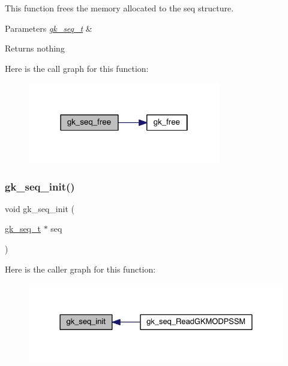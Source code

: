 This function frees the memory allocated to the seq structure. 


\begin{DoxyParams}{Parameters}
{\em \hyperlink{a00674}{gk\+\_\+seq\+\_\+t}} & \\
\hline
\end{DoxyParams}
\begin{DoxyReturn}{Returns}
nothing 
\end{DoxyReturn}
Here is the call graph for this function\+:\nopagebreak
\begin{figure}[H]
\begin{center}
\leavevmode
\includegraphics[width=238pt]{a00137_ac3ecbea172370c2a661afecad60b5685_cgraph}
\end{center}
\end{figure}
\mbox{\label{a00137_aab063d2d2e459531af4b4adfbf208054}} 
\subsubsection{\texorpdfstring{gk\+\_\+seq\+\_\+init()}{gk\_seq\_init()}}
{\footnotesize\ttfamily void gk\+\_\+seq\+\_\+init (\begin{DoxyParamCaption}\item[{\hyperlink{a00674}{gk\+\_\+seq\+\_\+t} $\ast$}]{seq }\end{DoxyParamCaption})}

Here is the caller graph for this function\+:\nopagebreak
\begin{figure}[H]
\begin{center}
\leavevmode
\includegraphics[width=328pt]{a00137_aab063d2d2e459531af4b4adfbf208054_icgraph}
\end{center}
\end{figure}
\mbox{\label{a00137_ad44124c9b40b8ffda2276f877526a261}} 
